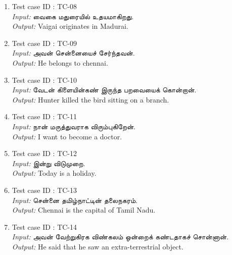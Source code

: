 \documentclass{article}
\begin{document}
\begin{itemize}
\begin{enumerate}
\item Test case ID : TC-08\\
      \textit{Input:} \texttamil{வைகை மதுரையில் உதயமாகிறது.}\\
      \textit{Output:} Vaigai originates in Madurai. \\    
      
\item Test case ID : TC-09\\
      \textit{Input:} \texttamil{அவன் சென்னையைச் சேர்ந்தவன்.}\\
      \textit{Output:} He belongs to chennai. \\        
      
\item Test case ID : TC-10\\
      \textit{Input:} \texttamil{வேடன் கிளையின்கண் இருந்த பறவையைக் கொன்றான்.}\\
      \textit{Output:} Hunter killed the bird sitting on a branch.\\
            
\item Test case ID : TC-11\\
      \textit{Input:} \texttamil{நான் மருத்துவராக விரும்புகிறேன்.}\\
      \textit{Output:} I want to become a doctor. \\        
            
\item Test case ID : TC-12\\
      \textit{Input:} \texttamil{இன்று விடுமுறை.}\\
      \textit{Output:} Today is a holiday. \\             
            
\item Test case ID : TC-13\\
      \textit{Input:} \texttamil{சென்னை தமிழ்நாட்டின் தலைநகரம்.}\\
      \textit{Output:} Chennai is the capital of Tamil Nadu. \\        
            
\item Test case ID : TC-14\\
      \textit{Input:} \texttamil{அவன் வேற்றுகிரக விண்கலம் ஒன்றைக் கண்டதாகச் சொன்னான்.}\\
      \textit{Output:} He said that he saw an extra-terrestrial object.\\
            

\end{enumerate}
\end{itemize}
\end{document}
